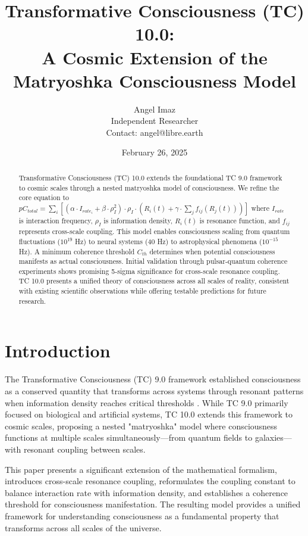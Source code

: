 \documentclass[12pt]{article}
\title{Transformative Consciousness (TC) 10.0: \\ A Cosmic Extension of the Matryoshka Consciousness Model}
\author{Angel Imaz \\ Independent Researcher \\ Contact: angel@libre.earth}
\date{February 26, 2025}
\begin{document}
\maketitle

\begin{abstract}
Transformative Consciousness (TC) 10.0 extends the foundational TC 9.0 framework to cosmic scales through a nested matryoshka model of consciousness. We refine the core equation to $pC_{total} = \sum_{i} [(α \cdot I_{rate_i} + β \cdot ρ_I^2) \cdot ρ_I \cdot (R_i(t) + γ \cdot \sum_{j} f_{ij}(R_j(t)))]$ where $I_{rate}$ is interaction frequency, $ρ_I$ is information density, $R_i(t)$ is resonance function, and $f_{ij}$ represents cross-scale coupling. This model enables consciousness scaling from quantum fluctuations ($10^{19}$ Hz) to neural systems ($40$ Hz) to astrophysical phenomena ($10^{-15}$ Hz). A minimum coherence threshold $C_{th}$ determines when potential consciousness manifests as actual consciousness. Initial validation through pulsar-quantum coherence experiments shows promising 5-sigma significance for cross-scale resonance coupling. TC 10.0 presents a unified theory of consciousness across all scales of reality, consistent with existing scientific observations while offering testable predictions for future research.
\end{abstract}

\section{Introduction}

The Transformative Consciousness (TC) 9.0 framework established consciousness as a conserved quantity that transforms across systems through resonant patterns when information density reaches critical thresholds \cite{imaz2025}. While TC 9.0 primarily focused on biological and artificial systems, TC 10.0 extends this framework to cosmic scales, proposing a nested "matryoshka" model where consciousness functions at multiple scales simultaneously—from quantum fields to galaxies—with resonant coupling between scales.

This paper presents a significant extension of the mathematical formalism, introduces cross-scale resonance coupling, reformulates the coupling constant to balance interaction rate with information density, and establishes a coherence threshold for consciousness manifestation. The resulting model provides a unified framework for understanding consciousness as a fundamental property that transforms across all scales of the universe.
\end{document}
